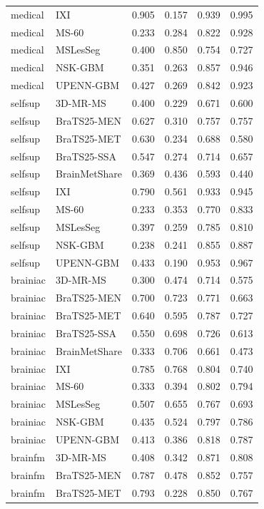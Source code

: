 \begin{tabular}{llrrrr}
medical & IXI & 0.905 & 0.157 & 0.939 & 0.995 \\
medical & MS-60 & 0.233 & 0.284 & 0.822 & 0.928 \\
medical & MSLesSeg & 0.400 & 0.850 & 0.754 & 0.727 \\
medical & NSK-GBM & 0.351 & 0.263 & 0.857 & 0.946 \\
medical & UPENN-GBM & 0.427 & 0.269 & 0.842 & 0.923 \\
selfsup & 3D-MR-MS & 0.400 & 0.229 & 0.671 & 0.600 \\
selfsup & BraTS25-MEN & 0.627 & 0.310 & 0.757 & 0.757 \\
selfsup & BraTS25-MET & 0.630 & 0.234 & 0.688 & 0.580 \\
selfsup & BraTS25-SSA & 0.547 & 0.274 & 0.714 & 0.657 \\
selfsup & BrainMetShare & 0.369 & 0.436 & 0.593 & 0.440 \\
selfsup & IXI & 0.790 & 0.561 & 0.933 & 0.945 \\
selfsup & MS-60 & 0.233 & 0.353 & 0.770 & 0.833 \\
selfsup & MSLesSeg & 0.397 & 0.259 & 0.785 & 0.810 \\
selfsup & NSK-GBM & 0.238 & 0.241 & 0.855 & 0.887 \\
selfsup & UPENN-GBM & 0.433 & 0.190 & 0.953 & 0.967 \\
brainiac & 3D-MR-MS & 0.300 & 0.474 & 0.714 & 0.575 \\
brainiac & BraTS25-MEN & 0.700 & 0.723 & 0.771 & 0.663 \\
brainiac & BraTS25-MET & 0.640 & 0.595 & 0.787 & 0.727 \\
brainiac & BraTS25-SSA & 0.550 & 0.698 & 0.726 & 0.613 \\
brainiac & BrainMetShare & 0.333 & 0.706 & 0.661 & 0.473 \\
brainiac & IXI & 0.785 & 0.768 & 0.804 & 0.740 \\
brainiac & MS-60 & 0.333 & 0.394 & 0.802 & 0.794 \\
brainiac & MSLesSeg & 0.507 & 0.655 & 0.767 & 0.693 \\
brainiac & NSK-GBM & 0.435 & 0.524 & 0.797 & 0.786 \\
brainiac & UPENN-GBM & 0.413 & 0.386 & 0.818 & 0.787 \\
brainfm & 3D-MR-MS & 0.408 & 0.342 & 0.871 & 0.808 \\
brainfm & BraTS25-MEN & 0.787 & 0.478 & 0.852 & 0.757 \\
brainfm & BraTS25-MET & 0.793 & 0.228 & 0.850 & 0.767 \\

\end{tabular}
